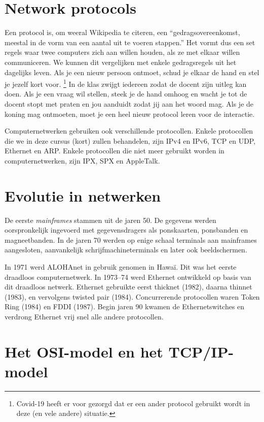 \section{Network protocols}

Een protocol is, om weeral Wikipedia te citeren, een ``gedragsovereenkomst, meestal in de vorm van een aantal uit te voeren stappen.''
Het vormt dus een set regels waar twee computers zich aan willen houden, als ze met elkaar willen communiceren.
We kunnen dit vergelijken met enkele gedragsregels uit het dagelijks leven.
Als je een nieuw persoon ontmoet, schud je elkaar de hand en stel je jezelf kort voor.%
  \footnote{Covid-19 heeft er voor gezorgd dat er een ander protocol gebruikt wordt in deze (en vele andere) situatie.}
In de klas zwijgt iedereen zodat de docent zijn uitleg kan doen.
Als je een vraag wil stellen, steek je de hand omhoog en wacht je tot de docent stopt met praten en jou aanduidt zodat jij aan het woord mag.
Als je de koning mag ontmoeten, moet je een heel nieuw protocol leren voor de interactie.

Computernetwerken gebruiken ook verschillende protocollen.
Enkele protocollen die we in deze cursus (kort) zullen behandelen, zijn
IPv4 en IPv6, TCP en UDP, Ethernet en ARP.
Enkele protocollen die niet meer gebruikt worden in computernetwerken, zijn IPX, SPX en AppleTalk.



\section{Evolutie in netwerken}

De eerste \emph{mainframes} stammen uit de jaren 50.
De gegevens werden oorspronkelijk ingevoerd met gegevensdragers als ponskaarten, ponsbanden en magneetbanden.
In de jaren 70 werden op enige schaal terminals aan mainframes aangesloten, aanvankelijk schrijfmachineterminals en later ook beeldschermen.

In 1971 werd ALOHAnet in gebruik genomen in Hawaï.
Dit was het eerste draadloos computernetwerk.
In 1973--74 werd Ethernet ontwikkeld op basis van dit draadloos netwerk.
Ethernet gebruikte eerst thicknet (1982), daarna thinnet (1983), en vervolgens twisted pair (1984).
Concurrerende protocollen waren Token Ring (1984) en FDDI (1987).
Begin jaren 90 kwamen de Ethernetswitches en verdrong Ethernet vrij snel alle andere protocollen.




\section{Het OSI-model en het TCP/IP-model}

